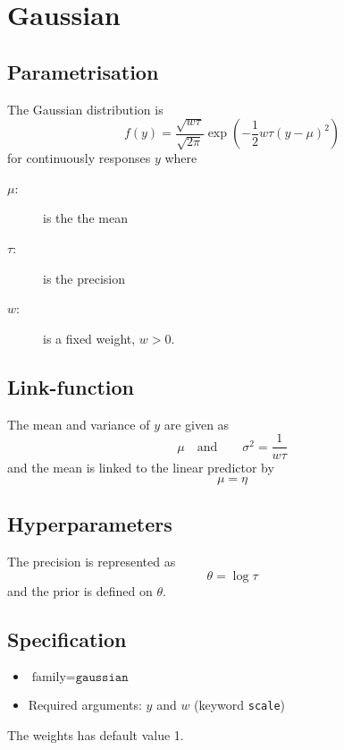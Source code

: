 \documentclass[a4paper,11pt]{article}
\begin{document}
\section*{Gaussian}

\subsection*{Parametrisation}

The Gaussian distribution is
\begin{displaymath}
    f(y) = \frac{\sqrt{w\tau}}{\sqrt{2\pi}} \exp\left( -\frac{1}{2}
      w\tau \left(y-\mu\right)^{2}\right)
\end{displaymath}
for continuously responses $y$ where
\begin{description}
\item[$\mu$:] is the the mean
\item[$\tau$:] is the precision
\item[$w$:] is a fixed weight, $w>0$.    
\end{description}

\subsection*{Link-function}

The mean and variance of $y$ are given as
\begin{displaymath}
    \mu \quad\text{and}\qquad \sigma^{2} = \frac{1}{w\tau}
\end{displaymath}
and the mean is linked to the linear predictor by
\begin{displaymath}
    \mu = \eta
\end{displaymath}

\subsection*{Hyperparameters}

The precision is represented as
\begin{displaymath}
    \theta = \log \tau
\end{displaymath}
and the prior is defined on $\theta$. 

\subsection*{Specification}

\begin{itemize}
\item $\text{family}=\texttt{gaussian}$
\item Required arguments: $y$ and $w$ (keyword \texttt{scale})
\end{itemize}
The weights has default value 1.
\end{document}
